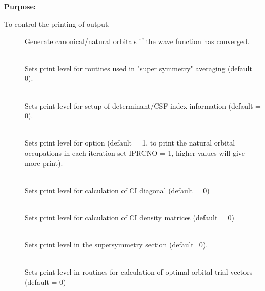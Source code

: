 \pagebreak[3]
\subsection{\label{ref-priinp}}

{\bf Purpose:}

To control the printing of output.

\begin{description}
\item[]
  Generate canonical/natural orbitals if the wave function has
  converged.

\item[]
   \\
  Sets print level for routines used in "super symmetry" averaging
  (default = 0).

\item[]
   \\
  Sets print level for setup of determinant/CSF index information (default = 0).

\item[]
   \\
  Sets print level for  option (default = 1,
  to print the natural orbital occupations in each iteration set
  IPRCNO = 1, higher values will give more print).

\item[]
   \\
  Sets print level for calculation of CI diagonal (default = 0)

\item[]
   \\
  Sets print level for calculation of CI density matrices (default = 0)


\item[]
   \\
  Sets print level in the supersymmetry section (default=0).

\item[]
   \\
  Sets print level in routines for calculation of optimal orbital trial
  vectors (default = 0)


\end{description}
